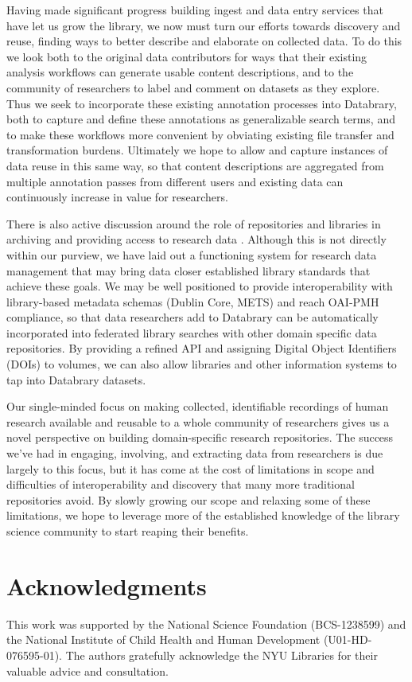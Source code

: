 \documentclass{sig-alternate}
\begin{document}
Having made significant progress building ingest and data entry services that have let us grow the library, we now must turn our efforts towards discovery and reuse, finding ways to better describe and elaborate on collected data.
To do this we look both to the original data contributors for ways that their existing analysis workflows can generate usable content descriptions, and to the community of researchers to label and comment on datasets as they explore.
Thus we seek to incorporate these existing annotation processes into Databrary, both to capture and define these annotations as generalizable search terms, and to make these workflows more convenient by obviating existing file transfer and transformation burdens.
Ultimately we hope to allow and capture instances of data reuse in this same way, so that content descriptions are aggregated from multiple annotation passes from different users and existing data can continuously increase in value for researchers.

There is also active discussion around the role of repositories and libraries in archiving and providing access to research data \cite{Castelli_etal_2013, Nielson_Hjørland_2014, Macmillan_2014}.
Although this is not directly within our purview, we have laid out a functioning system for research data management that may bring data closer established library standards that achieve these goals.
We may be well positioned to provide interoperability with library-based metadata schemas (Dublin Core, METS) and reach OAI-PMH compliance, so that data researchers add to Databrary can be automatically incorporated into federated library searches with other domain specific data repositories.
By providing a refined API and assigning Digital Object Identifiers (DOIs) to volumes, we can also allow libraries and other information systems to tap into Databrary datasets.

Our single-minded focus on making collected, identifiable recordings of human research available and reusable to a whole community of researchers gives us a novel perspective on building domain-specific research repositories.
The success we've had in engaging, involving, and extracting data from researchers is due largely to this focus, but it has come at the cost of limitations in scope and difficulties of interoperability and discovery that many more traditional repositories avoid.
By slowly growing our scope and relaxing some of these limitations, we hope to leverage more of the established knowledge of the library science community to start reaping their benefits.

\section*{Acknowledgments}

This work was supported by the National Science Foundation (BCS-1238599) and the National Institute of Child Health and Human Development (U01-HD-076595-01).
The authors gratefully acknowledge the NYU Libraries for their valuable advice and consultation.



\end{document}
